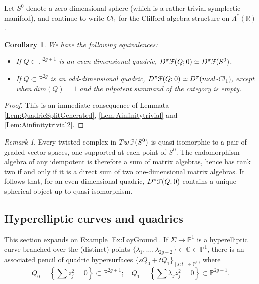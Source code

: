 \documentclass[reqno,10pt]{amsart}
\numberwithin{equation}{section}
\newcommand{\bC}{{\mathbb C}}
\newcommand{\bP}{{\mathbb P}}
\newcommand{\bR}{{\mathbb R}}
\newcommand{\scrF}{\EuScript{F}}
\newtheorem{Corollary}[thm]{Corollary}
\theoremstyle{remark}
\newtheorem{Remark}[thm]{Remark}
\begin{document}
Let $S^0$ denote a zero-dimensional sphere (which is a rather trivial symplectic manifold), and continue to write $Cl_1$ for the Clifford algebra structure on $\Lambda^*(\bR)$.


\begin{Corollary} \label{Cor:QuadricSorted}
We have the following equivalences:
\begin{itemize}
\item If $Q\subset \bP^{2g+1}$ is an even-dimensional quadric, 
$D^{\pi}\scrF(Q;0) \simeq D^{\pi}\scrF(S^0)$.
\item If $Q\subset \bP^{2g}$ is an odd-dimensional quadric, 
$D^{\pi}\scrF(Q;0) \simeq D^{\pi}(mod$-$Cl_1)$, except when $dim(Q)=1$ and the nilpotent summand of the category is empty.
\end{itemize}
\end{Corollary}

\begin{proof}
This is an immediate consequence of Lemmata \ref{Lem:QuadricSplitGenerated}, \ref{Lem:Ainfinitytrivial} and \ref{Lem:Ainfinitytrivial2}.
\end{proof}


\begin{Remark}
Every twisted complex in $Tw\,\scrF(S^0)$ is quasi-isomorphic to a pair of graded vector spaces, one supported at each point of $S^0$.  The endomorphism algebra of any idempotent is therefore a sum of matrix algebras, hence has rank two if and only if it is a direct sum of two one-dimensional matrix algebras. It follows that, for an even-dimensional quadric, $D^{\pi}\scrF(Q;0)$ contains a unique spherical object up to quasi-isomorphism.  
\end{Remark}




\subsection{Hyperelliptic curves and quadrics\label{Subsec:Pencil}}  This section expands on Example \ref{Ex:LayGround}.  If $\Sigma \rightarrow \bP^1$ is a hyperelliptic curve branched over the (distinct) points $\{\lambda_1,\ldots, \lambda_{2g+2}\} \subset \bC\subset \bP^1$, there is an associated pencil of quadric hypersurfaces $\{sQ_0 + tQ_1\}_{[s:t]\in\bP^1}$, where
\begin{equation} \label{Eqn:PencilCoord}
Q_0 = \left\{ \sum z_j^2 = 0\right\} \subset \bP^{2g+1}; \quad Q_1 = \left\{ \sum \lambda_j z_j^2 = 0 \right\} \subset \bP^{2g+1}.
\end{equation}
\end{document}
